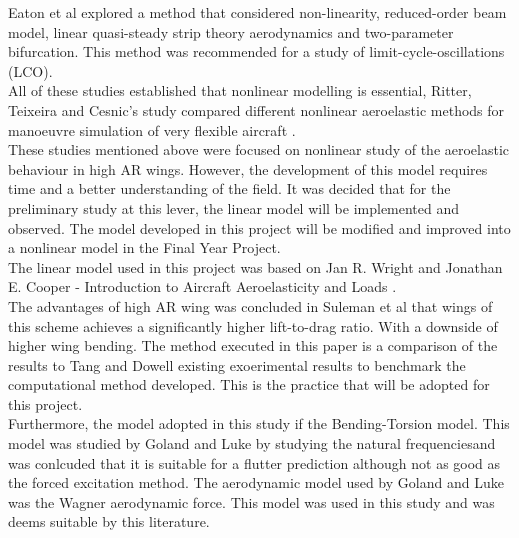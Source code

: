 \documentclass[11pt]{article}
\begin{document}
Eaton et al \cite{EatonNumericalWings} explored a method that considered non-linearity, reduced-order beam model, linear quasi-steady strip theory aerodynamics and two-parameter bifurcation. This method was recommended for a study of limit-cycle-oscillations (LCO).\\

All of these studies established that nonlinear modelling is essential, Ritter, Teixeira and Cesnic's study compared different nonlinear aeroelastic methods for manoeuvre simulation of very flexible aircraft \cite{Ritter2018ComparisonAircraft}.\\

These studies mentioned above were focused on nonlinear study of the aeroelastic behaviour in high AR wings. However, the development of this model requires time and a better understanding of the field. It was decided that for the preliminary study at this lever, the linear model will be implemented and observed. The model developed in this project will be modified and improved into a nonlinear model in the Final Year Project.\\

The linear model used in this project was based on Jan R. Wright and Jonathan E. Cooper - Introduction to Aircraft Aeroelasticity and Loads \cite{Wright2015INTRODUCTIONLOADS}.\\

The advantages of high AR wing was concluded in Suleman et al \cite{Suleman2017Non-linearVariation} that wings of this scheme achieves a significantly higher lift-to-drag ratio. With a downside of higher wing bending. The method executed in this paper is a comparison of the results to Tang and Dowell\cite{Tang2001ExperimentalWings} existing exoerimental results to benchmark the computational method developed. This is the practice that will be adopted for this project.\\

Furthermore, the model adopted in this study if the Bending-Torsion model. This model was studied by Goland and Luke \cite{Goland1949AWings} by studying the natural frequenciesand was conlcuded that it is suitable for a flutter prediction although not as good as the forced excitation method. The aerodynamic model used by Goland and Luke was the Wagner aerodynamic force. This model was used in this study and was deems suitable by this literature.
\end{document}
